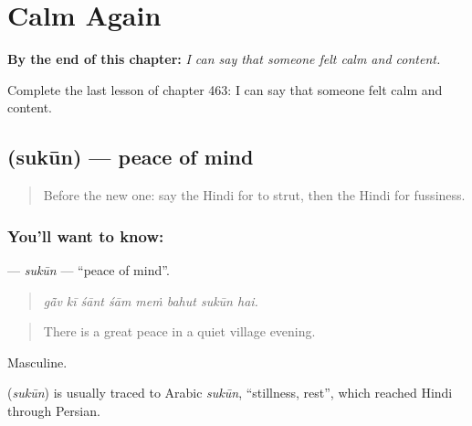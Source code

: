 
\chapter{Calm Again}
\label{ch:hi-calm-again}

\begin{chapteropening}
\textbf{By the end of this chapter:} \emph{I can say that someone felt calm and content.}

Complete the last lesson of chapter 463: I can say that someone felt calm and content.
\end{chapteropening}

\section[\texorpdfstring{\hi{सुकून} (sukūn)}{सुकून (sukūn)}]{ (sukūn) — peace of mind}

\label{lesson:HI-C463-sukun}



\begin{quote}
Before the new one: say the Hindi for to strut, then the Hindi for fussiness.
\end{quote}

\subsection*{You'll want to know: }
\textbf{} — \emph{sukūn} — \textquotedblleft{}peace of mind\textquotedblright{}.

\begin{quote}
       
\end{quote}

\begin{quote}
\emph{gā̃v kī śānt śām meṁ bahut sukūn hai.}
\end{quote}

\begin{quote}
There is a great peace in a quiet village evening.
\end{quote}

Masculine.

\begin{cousinweb}
\textbf{} (\emph{sukūn}) is usually traced to Arabic \emph{sukūn}, \textquotedblleft{}stillness, rest\textquotedblright{}, which reached Hindi through Persian.
\end{cousinweb}

